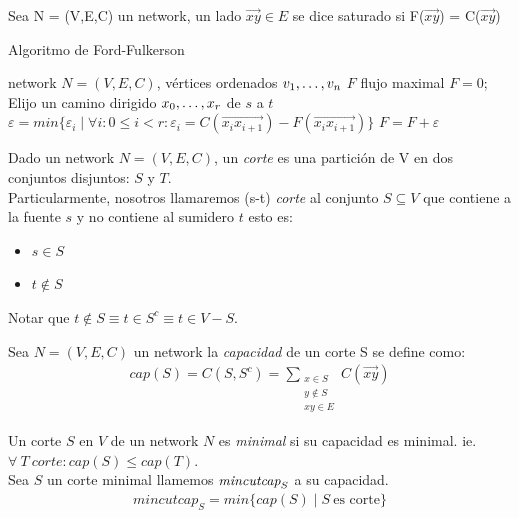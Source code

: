 \begin{definition}
Sea N = (V,E,C) un network, un lado $\overrightarrow{xy} \in E$ se dice saturado si F($\overrightarrow{xy}$) = C($\overrightarrow{xy}$) 
\end{definition}

\begin{algorithm}
\caption{Algoritmo de Ford-Fulkerson}
\begin{algorithmic}
\Require network $N=(V,E,C)$, vértices ordenados $v_1,\mathellipsis, v_n$
\Ensure  $F $ flujo maximal
    \State $F = 0$;
    \State Elijo un camino dirigido $x_0,\mathellipsis,x_r$ de $s$ a $t$
    \State $\varepsilon = min\{\varepsilon_i \mid \forall i: 0\le i < r: \varepsilon_i = C(\overrightarrow{x_i x_{i+1}}) - F(\overrightarrow{x_i x_{i+1}})\}$
    \State $F = F + \varepsilon$
    \EndWhile
    \LeftComment{$\forall$}
\State {}
\EndFunction
\end{algorithmic}
\end{algorithm}

\begin{definition}[Corte]
Dado un network $N = (V, E, C)$, un  \emph{corte} es una partición de V en dos conjuntos disjuntos: $S$ y $T$. \\Particularmente, nosotros llamaremos (s-t) \emph{corte} al conjunto $S \subseteq V$ que contiene a la fuente $s$ y no contiene al sumidero $t$ esto es:
\begin{itemize}
    \item $s\in S$
    \item $t\not\in S$
\end{itemize}
Notar que $t \not\in S \equiv t \in S^c \equiv t\in V-S$.
\end{definition}

\begin{definition}
Sea $N = (V, E, C)$ un network
la \emph{capacidad} de un corte S se define como:
\begin{align}
    cap(S) = C(S,S^c) = \sum_{\substack{x\in S\\y\not\in S\\xy\in E}} C(\overrightarrow{xy})
\end{align}
\end{definition}

\begin{definition}
Un corte $S$ en $V$ de un network $N$ es \emph{minimal} si su capacidad es minimal. ie.\\
$\forall\ T\ corte: cap(S) \le cap(T)$.\\

Sea $S$ un corte minimal llamemos $\emph{mincutcap}_S$ a su capacidad.
\begin{align}
    mincutcap_S = min\{cap(S) \mid S\ \text{es corte}\}
\end{align}
\end{definition}

